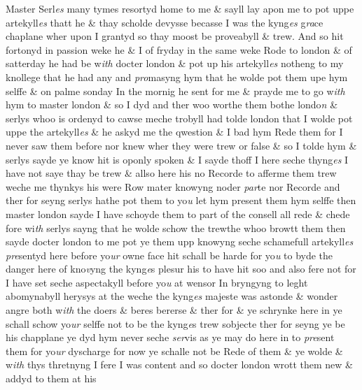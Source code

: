 \documentclass[12pt, a4paper]{book}
\begin{document}
            			
		\ifthenelse{\isodd{\thepage}}
		{\reversemarginpar}
		{\normalmarginpar}
		Master Serl\textit{es} many tymes resortyd home to me \& sayll lay apon me to pot
  uppe artekyll\textit{es} thatt he \& thay scholde devysse becasse I was the kyng\textit{es} g\textit{ra}ce
  chaplane wher upon I grantyd so thay moost be proveabyll \& trew. And so hit
            				fortonyd in passion weke he \& I of fryday in the same weke Rode to london
 \& of satterday he had be w\textit{ith} docter london \& pot up his artekyll\textit{es} notheng to
 my knollege that he had any and \textit{pro}masyng hym that he wolde pot them upe
 hym selffe \& on palme sonday In the mornig he sent for me \& prayde me to
 go w\textit{ith} hym to master london \& so I dyd and ther woo worthe them bothe londo\textit{n}
            				\& serlys whoo is ordenyd to cawse meche trobyll had tolde london that I
 wolde pot uppe the artekyll\textit{es} \& he askyd me the qwestion \& I bad hym Rede them
 for I never saw them before nor knew wher they were trew or false \& so I tolde
 hym \& serlys sayde ye know hit is oponly spoken \& I sayde thoff I here seche
 thyng\textit{es} I have not saye thay be trew \& allso here his no Recorde to afferme
 them trew weche me thynkys his were Row mater knowyng noder \textit{par}te
            				nor Recorde and ther for seyng serlys hathe pot them to yo\textit{u} let hym
            				present them hym selffe then master london sayde I have schoyde them to part
            				of the consell all rede \& chede fore wi\textit{th} serlys sayng that he wolde schow the
            				trewthe whoo browtt them then sayde docter london to me pot ye them
 upp knowyng seche schamefull artekyll\textit{es}
               \textit{pre}sentyd here before yo\textit{ur} owne face
 hit schall be harde for yo\textit{u} to byde the danger here of kno\textit{v}yng the kyng\textit{e}s
 plesur his to have hit soo and also fere not for I have set seche aspectakyll
 before yo\textit{u} at wensor In bryngyng to leght abomynabyll herysys at the
 weche the kyng\textit{es} majeste was astonde \& wonder angre both w\textit{ith} the doers \&
 beres bererse \& ther for \& ye schrynke here in ye schall schow yo\textit{ur} selffe not
 to be the kyng\textit{e}s trew sobjecte ther for seyng ye be his chapplane ye dyd
 hym never seche \textit{ser}vis as ye may do here in to \textit{pre}sent them for yo\textit{ur }dyscharge
 for now ye schalle not be Rede of them \& ye wolde \& w\textit{ith} thys thretnyng I fere
            				I was content and so docter london wrott them new \& addyd to them at his
\end{document}
